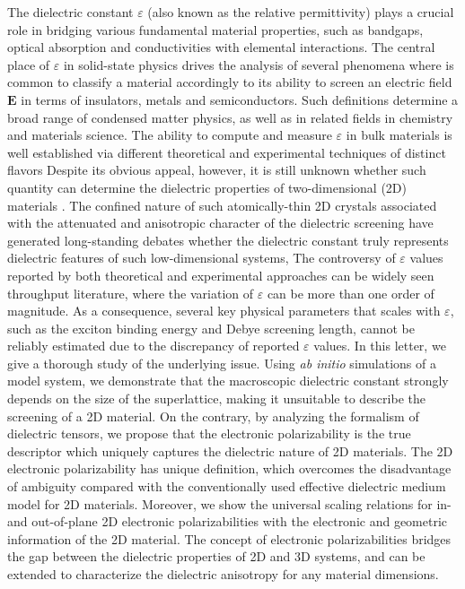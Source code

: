 The dielectric constant $\varepsilon$ (also known as the relative permittivity) 
plays a crucial role in bridging various fundamental material
properties, such as bandgaps\cite{Moss_1950_relation,Moss_1985_n_Eg}, 
optical absorption\cite{kittel_2005_introduction} and 
conductivities\cite{Dressel_2001_electrodynamics}   
with elemental interactions. 
The central place of $\varepsilon$ in solid-state physics drives the analysis of several phenomena 
where is common to classify a material accordingly to its ability to screen an 
electric field $\boldsymbol{E}$ in terms of insulators, metals and semiconductors. Such definitions determine a broad range of 
condensed matter physics, as well as in related fields in chemistry and materials science. 
The ability to compute and measure $\varepsilon$ in bulk materials is well established via different 
theoretical \cite{Adler_1962,Hybertsen_1987} and experimental techniques \cite{palik_1998handbook} of distinct flavors
%
Despite its obvious appeal, however, it is still unknown whether such quantity can determine the 
dielectric properties of two-dimensional (2D) materials \cite{Novoselov_2016}.  
%
The confined nature of such atomically-thin 2D crystals associated
with the attenuated and anisotropic character of the dielectric
screening
\cite{Keldysh_1979_eps_multi,Sharma_1985,Low_2014_screening_BP,Cudazzo_2011_screening_2D,Bechstedt_2012,Cudazzo_2010_screen2D,Nazarov_2015_2D_3D}
have generated long-standing debates whether the dielectric constant
truly represents dielectric features of such low-dimensional systems,
The controversy of
$\varepsilon$ values reported by both theoretical and experimental
approaches can be widely seen throughput literature\cite{Li_2016},
where the variation of $\varepsilon$ can be more than one order of
magnitude. As a consequence, several key physical parameters that
scales with $\varepsilon$, such as the exciton binding energy and
Debye screening length, cannot be reliably estimated due to the
discrepancy of reported $\varepsilon$ values. In this letter, we give
a thorough study of the underlying issue. Using \textit{ab initio}
simulations of a model system, we demonstrate that the macroscopic
dielectric constant strongly depends on the size of the superlattice,
making it unsuitable to describe the screening of a 2D material. On
the contrary, by analyzing the formalism of dielectric tensors, we
propose that the electronic polarizability is the true descriptor
which uniquely captures the dielectric nature of 2D materials. The 2D
electronic polarizability has unique definition, which overcomes the
disadvantage of ambiguity compared with the conventionally used
effective dielectric medium model for 2D materials. Moreover, we show
the universal scaling relations for in- and out-of-plane 2D electronic
polarizabilities with the electronic and geometric information of the
2D material. The concept of electronic polarizabilities bridges the
gap between the dielectric properties of 2D and 3D systems, and can be
extended to characterize the dielectric anisotropy for any material
dimensions.


